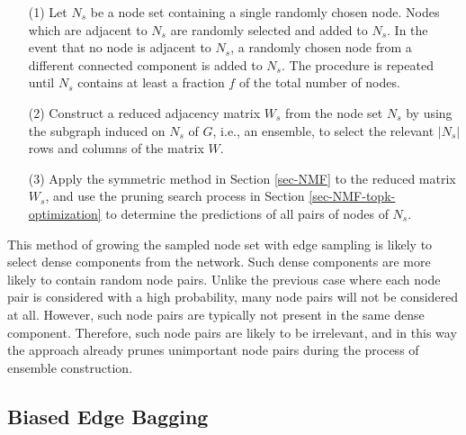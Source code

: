 \vspace{-1ex}
\begin{enumerate}
\item[(1)]Let $N_s$ be a node set containing a single randomly chosen
node. Nodes which are adjacent to $N_s$ are randomly selected and
added to $N_s$. In the event that no node is adjacent to $N_s$, a
randomly chosen node from a different connected component is added
to $N_s$. The procedure is repeated until $N_s$ contains at least a
fraction $f$ of the total number of nodes.

\item[(2)]  Construct a reduced
adjacency matrix $W_s$ from the node set $N_s$ by using the subgraph
induced on $N_s$ of $G$, i.e., an ensemble, to select the relevant $|N_s|$ rows and columns of the matrix $W$.

\item[(3)] Apply the symmetric \NMF method in Section \ref{sec-NMF}
to the reduced matrix $W_s$, and use the pruning search process in Section \ref{sec-NMF-topk-optimization} to determine the predictions of all pairs of nodes  of $N_s$.
\end{enumerate}
\vspace{-1ex}


This method of growing the sampled node set with edge sampling is
likely to select dense components from the network. Such dense
components are more likely to contain random node pairs. Unlike the
previous case where each node pair is considered with a high
probability, many node pairs will not be considered at all. However,
such node pairs are typically not present in the same dense
component. Therefore, such node pairs are likely to be irrelevant,
and in this way the approach already prunes unimportant node pairs
during the process of ensemble construction.



\subsection{Biased Edge Bagging}

